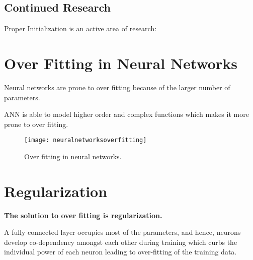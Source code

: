 	\subsection{Continued Research}
Proper Initialization is an active area of research:


	\section{Over Fitting in Neural Networks}

	\begin{bulletedlist}
		\item Neural networks are prone to over fitting because of the larger number of parameters.
		\item ANN is able to model higher order and complex functions which makes it more prone to over fitting.
	\end{bulletedlist}

 	\begin{figure}[htb]
		\centering
		\texttt{[image: neuralnetworksoverfitting]}
		\caption[Over fitting in neural networks]{Over fitting in neural networks.}
		\label{fig:neuralnetworksoverfitting}
	\end{figure}

	\section{Regularization}
{\bfseries The solution to over fitting is regularization.}

A fully connected layer occupies most of the parameters, and hence, neurons develop co-dependency amongst each other during training which curbs the individual power of each neuron leading to over-fitting of the training data.

